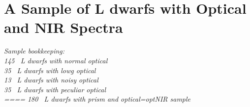 \documentclass[12pt,preprint]{aastex}
\newcommand{\sample}{180}
\newcommand{\optNormal}{145}
\newcommand{\optLowG}{35}
\newcommand{\optNoisy}{13}
\newcommand{\optPec}{35}
\begin{document}
% 

\section{A Sample of L dwarfs with Optical and NIR Spectra}
\label{sec:sample}

\emph{Sample bookkeeping:\\
\optNormal~ L dwarfs with normal optical\\
\optLowG~ L dwarfs with lowg optical\\
\optNoisy~ L dwarfs with  noisy optical\\
\optPec~ L dwarfs with  peculiar optical\\
====
\sample~ L dwarfs with prism and optical=optNIR sample\\
}
\end{document}
